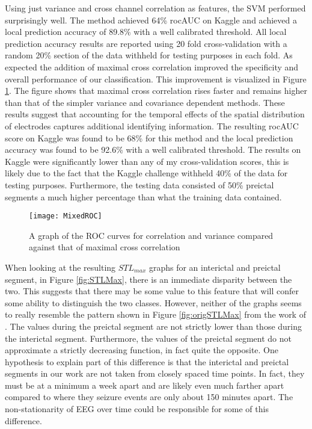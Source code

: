 Using just variance and cross channel correlation as features, the SVM performed surprisingly well.  The method achieved 64\% rocAUC on Kaggle and achieved a local prediction accuracy of 89.8\% with a well calibrated threshold.  All local prediction accuracy results are reported using 20 fold cross-validation with a random 20\% section of the data withheld for testing purposes in each fold.  As expected the addition of maximal cross correlation improved the specificity and overall performance of our classification.  This improvement is visualized in Figure \ref{fig:mixedROC}.  The figure shows that maximal cross correlation rises faster and remains higher than that of the simpler variance and covariance dependent methods.  These results suggest that accounting for the temporal effects of the spatial distribution of electrodes captures additional identifying information.  The resulting rocAUC score on Kaggle was found to be 68\% for this method and the local prediction accuracy was found to be 92.6\% with a well calibrated threshold.  The results on Kaggle were significantly lower than any of my cross-validation scores, this is likely due to the fact that the Kaggle challenge withheld 40\% of the data for testing purposes.  Furthermore, the testing data consisted of 50\% preictal segments a much higher percentage than what the training data contained.

\begin{figure}[!t]
\centering
  \texttt{[image: MixedROC]}
  \caption{A graph of the ROC curves for correlation and variance compared against that of maximal cross correlation} \label{fig:mixedROC}
\end{figure}

When looking at the resulting $STL_{max}$ graphs for an interictal and preictal segment, in Figure \ref{fig:STLMax}, there is an immediate disparity between the two.  This suggests that there may be some value to this feature that will confer some ability to distinguish the two classes. However, neither of the graphs seems to really resemble the pattern shown in Figure \ref{fig:origSTLMax} from the work of \cite{iasemidis05}.  The values during the preictal segment are not strictly lower than those during the interictal segment.  Furthermore, the values of the preictal segment do not approximate a strictly decreasing function, in fact quite the opposite.  One hypothesis to explain part of this difference is that the interictal and preictal segments in our work are not taken from closely spaced time points.  In fact, they must be at a minimum a week apart and are likely even much farther apart compared to \cite{iasemidis05} where they seizure events are only about 150 minutes apart.  The non-stationarity of EEG over time could be responsible for some of this difference. 

